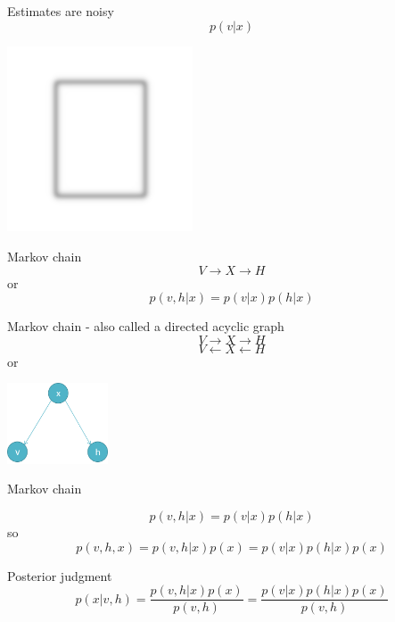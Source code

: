 \documentclass{beamer}
\newcommand{\crish}{\color{reddish}}
\newcommand{\cbla}{\color{black}}
\begin{document}
\begin{frame}{Estimates are noisy}
\crish$$p(v|x)$$\cbla{} 
  \begin{center}
\includegraphics[width=5.5cm]{blurred_box.png}
\end{center}
\end{frame}

\begin{frame}{Markov chain}
\crish$$
V\rightarrow X\rightarrow H
$$\cbla{}
or
\crish$$
p(v,h|x)=p(v|x)p(h|x)
$$\cbla{}
\end{frame}


\begin{frame}{Markov chain - also called a directed acyclic graph}
\crish$$
V\rightarrow X\rightarrow H
$$\cbla{}
\crish$$
V\leftarrow X\leftarrow H
$$\cbla{}
or
\begin{center}
  \includegraphics[width=3cm]{fig_dag.png}
\end{center}
\end{frame}


\begin{frame}{Markov chain}

\crish$$
p(v,h|x)=p(v|x)p(h|x)
$$\cbla{}
so
\crish$$
p(v,h,x)=p(v,h|x)p(x)=p(v|x)p(h|x)p(x)
$$\cbla{}
\end{frame}

\begin{frame}{Posterior judgment}
  \crish$$
  p(x|v,h)=\frac{p(v,h|x)p(x)}{p(v,h)}=\frac{p(v|x)p(h|x)p(x)}{p(v,h)}
  $$\cbla{}
\end{frame}
\end{document}
